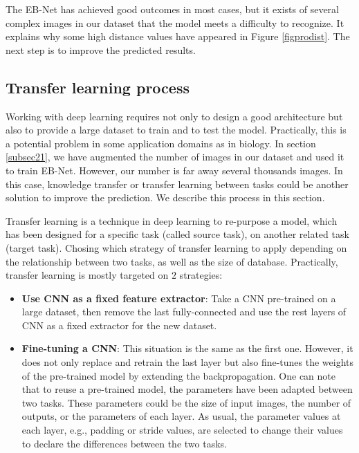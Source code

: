 \documentclass[review]{elsarticle}
\begin{document}
The EB-Net has achieved good outcomes in most cases, but it exists of several complex images in our dataset that the model meets a difficulty to recognize. It explains why some high distance values have appeared in Figure \ref{figprodist}. The next step is to improve the predicted results.

\subsection{Transfer learning process}
Working with deep learning requires not only to design a good architecture but also to provide a large dataset to train and to test the model. Practically, this is a potential problem in some application domains as in biology. In section \ref{subsec21}, we have augmented the number of images in our dataset and used it to train EB-Net. However, our number is far away several thousands images. In this case, knowledge transfer or transfer learning between tasks could be another solution to improve the prediction. We describe this process in this section.

Transfer learning \cite{olivas2009handbook, yosinski2014transferable} is a technique in deep learning to re-purpose a model, which has been designed for a specific task (called source task), on another related task (target task). Chosing which strategy of transfer learning to apply depending on the relationship between two tasks, as well as the size of database. Practically, transfer learning is mostly targeted on $2$ strategies:
\begin{itemize}
	\item \textbf{Use CNN as a fixed feature extractor}: Take a CNN pre-trained on a large dataset, then remove the last fully-connected and use the rest layers of CNN as a fixed extractor for the new dataset.
	\item \textbf{Fine-tuning a CNN}: This situation is the same as the first one. However, it does not only replace and retrain the last layer but also fine-tunes the weights of the pre-trained model by extending the backpropagation. One can note that to reuse a pre-trained model, the parameters have been adapted between two tasks. These parameters could be the size of input images, the number of outputs, or the parameters of each layer. As usual, the parameter values at each layer, e.g., padding or stride values, are selected to change their values to declare the differences between the two tasks.
\end{itemize}
\end{document}
